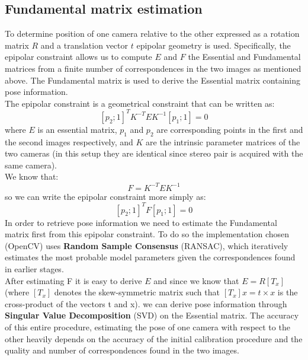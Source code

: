 \documentclass[12pt]{amsart}
\begin{document}
\subsection{Fundamental matrix estimation}
To determine position of one camera relative to the other expressed as a rotation matrix \(R\) and a translation vector \(t\) epipolar geometry is used.
Specifically, the epipolar constraint allows us to compute \(E\) and \(F\) the Essential and Fundamental matrices from a finite number of correspondences in the two images as mentioned above.
The Fundamental matrix is used to derive the Essential matrix containing pose information.\\
The epipolar constraint is a geometrical constraint that can be written as:
\[[p_2; 1]^T K^{-T} E K^{-1} [p_1; 1] = 0\]
where \(E\) is an essential matrix, \(p_1\) and \(p_2\) are corresponding points in the first and the second images respectively,
and \(K\) are the intrinsic parameter matrices of the two cameras (in this setup they are identical since stereo pair is acquired with the same camera).
\\
We know that: 
\[F = K^{-T} E K^{-1}\]
so we can write the epipolar constraint more simply as:
\[[p_2; 1]^T F [p_1; 1] = 0\]
In order to retrieve pose information we need to estimate the Fundamental matrix first from this epipolar constraint. 
To do so the implementation chosen (OpenCV) uses \textbf{Random Sample Consensus} (RANSAC), which iteratively estimates the most probable model parameters given the correspondences
found in earlier stages.\\
After estimating F it is easy to derive \(E\) and since we know that \(E = R[T_x]\) (where \([T_x]\) denotes the skew-symmetric matrix such that \([T_x]x = t \times x \) is the cross-product of the vectors t and x).
we can derive pose information through \textbf{Singular Value Decomposition} (SVD) on the Essential matrix.
The accuracy of this entire procedure, estimating the pose of one camera with respect to the other heavily depends on the accuracy of the initial calibration procedure and
the quality and number of correspondences found in the two images.
\end{document}
